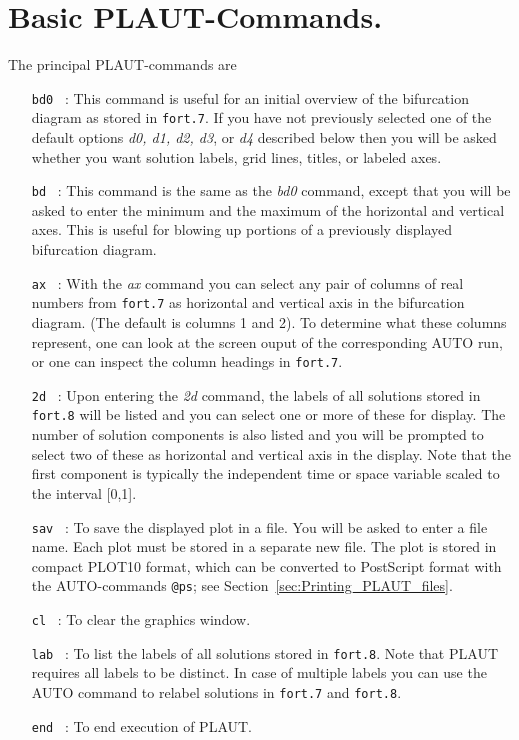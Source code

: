 \documentclass[12pt]{report}
\begin{document}
\section{ Basic {\cal PLAUT}-Commands.} \label{sec:main_PLAUT_commands}
The principal {\cal PLAUT}-commands are 
\begin{itemize}
\item[\tt bd0]~:
  This command is useful for an initial overview of the bifurcation
  diagram as stored in {\tt fort.7}.
  If you have not previously selected one of the default options 
  {\it d0, d1, d2, d3}, or {\it d4} described below then you will be asked
  whether you want solution labels, grid lines, titles, or labeled axes.

\item[\tt bd]~:
  This command is the same as the {\it bd0} command, except that you will be
  asked to enter the minimum and the maximum of the horizontal and 
  vertical axes.
  This is useful for blowing up portions of a previously displayed
  bifurcation diagram.

\item[\tt ax]~:
  With the {\it ax} command you can select any pair of columns of real
  numbers from {\tt fort.7} as horizontal and vertical axis in the
  bifurcation diagram. (The default is columns 1 and 2).
  To determine what these columns represent, one can look at the
  screen ouput of the corresponding {\cal AUTO} run, or one can inspect the
  column headings in {\tt fort.7}.
  
\item[\tt 2d]~:
  Upon entering the {\it 2d} command, the labels of all solutions stored 
  in {\tt fort.8} will be listed and you can select one or more of these 
  for display. The number of solution components is also listed
  and you will be prompted to select two of these as horizontal and
  vertical axis in the display.
  Note that the first component is typically the independent 
  time or space variable scaled to the interval [0,1].

\item[\tt sav]~:
  To save the displayed plot in a file. You will be asked to enter
  a file name. Each plot must be stored in a separate new file.
  The plot is stored in compact {\cal PLOT10} format, which can be converted to 
  {\cal PostScript} format with the {\cal AUTO}-commands {\tt @ps};
  see Section~\ref{sec:Printing_PLAUT_files}.

\item[\tt cl]~:  To clear the graphics window.

\item[\tt lab]~:
  To list the labels of all solutions stored in {\tt fort.8}.
  Note that {\cal PLAUT} requires all labels to be distinct.
  In case of multiple labels you can use the {\cal AUTO}
  command  to relabel solutions in
  {\tt fort.7} and {\tt fort.8}.

\item[\tt end]~:  To end execution of {\cal PLAUT}.
\end{itemize}
\end{document}
